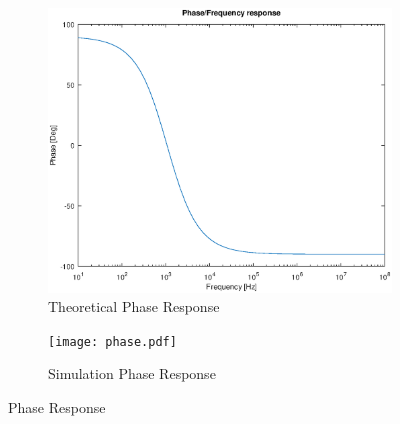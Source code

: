 \begin{figure}[h]
\centering
\begin{subfigure}{.5\textwidth}
    \centering
    \vspace{2.8 cm}
    \includegraphics[scale=0.4]{phase_response.eps}
    \caption{Theoretical Phase Response}
\end{subfigure}%
\begin{subfigure}{.5\textwidth}
    \centering
    \texttt{[image: phase.pdf]}
    \caption{Simulation Phase Response}
\end{subfigure}
\caption{Phase Response}
\label{fig:comp1}
\end{figure}

